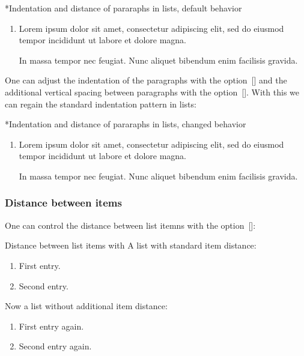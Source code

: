 \begin{showlatex}*{Indentation and distance of pararaphs in lists, default behavior}
\begin{enumerate}
  \item
    Lorem ipsum dolor sit amet, consectetur adipiscing elit, sed do eiusmod tempor incididunt ut labore et dolore magna.
    
    In massa tempor nec feugiat. Nunc aliquet bibendum enim facilisis gravida.
\end{enumerate}
\end{showlatex}

One can adjust the indentation of the paragraphs with the option~[\optname] and the additional vertical spacing between paragraphs with the option~[\optname].
With this we can regain the standard indentation pattern in lists:

\begin{showlatex}*{Indentation and distance of pararaphs in lists, changed behavior}
\begin{enumerate}[listparindent = \parindent, parsep = 0pt]
  \item
    Lorem ipsum dolor sit amet, consectetur adipiscing elit, sed do eiusmod tempor incididunt ut labore et dolore magna.
    
    In massa tempor nec feugiat. Nunc aliquet bibendum enim facilisis gravida.
\end{enumerate}
\end{showlatex}

\subsubsection{Distance between items}

One can control the distance between list itemns with the option~[\optname]:

\begin{showlatex}{Distance between list items with }
A list with standard item distance:
\begin{enumerate}
  \item
    First entry.
  \item
    Second entry.
\end{enumerate}
Now a list without additional item distance:
\begin{enumerate}[itemsep = 0pt]
  \item
    First entry again.
  \item
    Second entry again.
\end{enumerate}
\end{showlatex}

